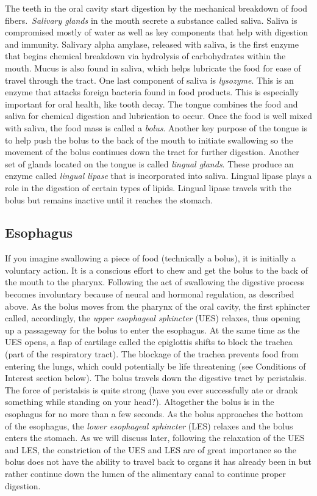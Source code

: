 \documentclass{tufte-handout}
\begin{document}
The teeth in the oral cavity start digestion by the mechanical breakdown of food fibers.\ \emph{Salivary glands} in the mouth secrete a substance called saliva. Saliva is compromised mostly of water as well as key components that help with digestion and immunity. Salivary alpha amylase, released with saliva, is the first enzyme that begins chemical breakdown via hydrolysis of carbohydrates within the mouth. Mucus is also found in saliva, which helps lubricate the food for ease of travel through the tract. One last component of saliva is \emph{lysozyme}. This is an enzyme that attacks foreign bacteria found in food products. This is especially important for oral health, like tooth decay. The tongue combines the food and saliva for chemical digestion and lubrication to occur. Once the food is well mixed with saliva, the food mass is called a \emph{bolus}. Another key purpose of the tongue is to help push the bolus to the back of the mouth to initiate swallowing so the movement of the bolus continues down the tract for further digestion. Another set of glands located on the tongue is called \emph{lingual glands}. These produce an enzyme called \emph{lingual lipase} that is incorporated into saliva. Lingual lipase plays a role in the digestion of certain types of lipids. Lingual lipase travels with the bolus but remains inactive until it reaches the stomach.

\subsection{Esophagus}
If you imagine swallowing a piece of food (technically a bolus), it is initially a voluntary action. It is a conscious effort to chew and get the bolus to the back of the mouth to the pharynx. Following the act of swallowing the digestive process becomes involuntary because of neural and hormonal regulation, as described above. As the bolus moves from the pharynx of the oral cavity, the first sphincter called, accordingly, the \emph{upper esophageal sphincter} (UES) relaxes, thus opening up a passageway for the bolus to enter the esophagus. At the same time as the UES opens, a flap of cartilage called the epiglottis shifts to block the trachea (part of the respiratory tract). The blockage of the trachea prevents food from entering the lungs, which could potentially be life threatening (see Conditions of Interest section below). The bolus travels down the digestive tract by peristalsis. The force of peristalsis is quite strong (have you ever successfully ate or drank something while standing on your head?). Altogether the bolus is in the esophagus for no more than a few seconds. As the bolus approaches the bottom of the esophagus, the \emph{lower esophageal sphincter} (LES) relaxes and the bolus enters the stomach. As we will discuss later, following the relaxation of the UES and LES, the constriction of the UES and LES are of great importance so the bolus does not have the ability to travel back to organs it has already been in but rather continue down the lumen of the alimentary canal to continue proper digestion. 
\end{document}
